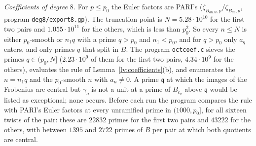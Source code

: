 \emph{Coefficients of degree $8$.} For $p\le p_0$ the Euler factors are PARI's
($\zeta_{B_{ab,w},p}/\zeta_{B_{ab},p}$, program \texttt{deg8/export8.gp}).
The truncation point is $N=5.28\cdot10^{10}$ for the first two pairs and
$1.055\cdot10^{11}$ for the others, which is less than $p_0^2$. So every
$n\le N$ is either $p_0$-smooth or $n_1q$ with a prime $q>p_0$ and $n_1<p_0$,
and for $q>p_0$ only $a_q$ enters, and only primes $q$ that split in $B$.
The program \texttt{octcoef.c} sieves the primes $q\in(p_0,N]$
($2.23\cdot10^9$ of them for the first two pairs, $4.34\cdot10^9$ for the
others), evaluates the rule of Lemma~\ref{lv:coefficients}(b), and enumerates
the $n=n_1q$ and the $p_0$-smooth $n$ with $a_n\ne0$. A prime $\mathfrak q$
at which the images of the Frobenius are central but $\gamma_o$ is not a unit
at a prime of $B_{c_o}$ above $\mathfrak q$ would be listed as exceptional;
none occurs. Before each run the program compares the rule with PARI's Euler
factors at every unramified prime in $(1000,p_0]$, for all sixteen twists of
the pair: these are $22832$ primes for the first two pairs and $43222$ for the
others, with between $1395$ and $2722$ primes of $B$ per pair at which both
quotients are central.

